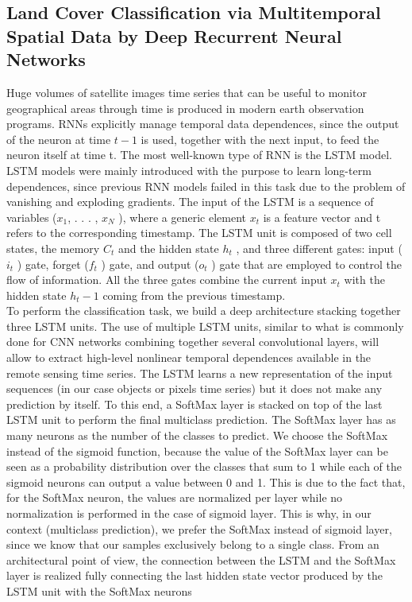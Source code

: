 \documentclass[10pt,a4paper,journal]{IEEEtran}
\begin{document}
\subsection{Land Cover Classification via Multitemporal Spatial Data by Deep Recurrent Neural Networks\cite{3}}
\hspace{2em} Huge volumes of satellite images time series that can
be useful to monitor geographical areas through time is produced in modern earth observation programs. RNNs explicitly manage temporal data dependences, since the output of the
neuron at time $t-1$ is used, together with the next input,
to feed the neuron itself at time t. The most well-known type of RNN is the LSTM model.
LSTM models were mainly introduced with the purpose to
learn long-term dependences, since previous RNN models
failed in this task due to the problem of vanishing and exploding gradients. The input of the LSTM is a sequence of variables ($x_1$, . . . , $x_N$ ), where a generic element $x_t$ is a feature vector and t refers to the corresponding timestamp. The LSTM unit is composed of two cell states, the memory $C_t$ and the hidden state $h_t$ , and three different gates: input ($i_t$ ) gate, forget ($f_t$ ) gate, and output ($o_t$ ) gate that are employed to control the flow of information. All the three gates combine the current input $x_t$ with the hidden state $h_t−1$ coming from the previous timestamp.\\

\hspace{2em} To perform the classification task, we build a deep architecture stacking together three LSTM units. The use of multiple
LSTM units, similar to what is commonly done for CNN
networks combining together several convolutional layers, will allow to extract high-level nonlinear temporal dependences available in the remote sensing time series. The LSTM learns a new representation of the input sequences (in our case objects or pixels time series) but it does not make any prediction by itself. To this end, a SoftMax layer is stacked on top of the last LSTM unit to perform the final multiclass
prediction. The SoftMax layer has as many neurons as the number of the classes to predict. We choose the SoftMax instead of the sigmoid function, because the value of the SoftMax layer can be seen as a probability distribution over the classes that sum to 1 while each of the sigmoid neurons can output a value between 0 and 1. This is due to the fact that, for
the SoftMax neuron, the values are normalized per layer while
no normalization is performed in the case of sigmoid layer.
This is why, in our context (multiclass prediction), we prefer the SoftMax instead of sigmoid layer, since we know that
our samples exclusively belong to a single class. From an
architectural point of view, the connection between the LSTM
and the SoftMax layer is realized fully connecting the last
hidden state vector produced by the LSTM unit with the
SoftMax neurons
\end{document}
